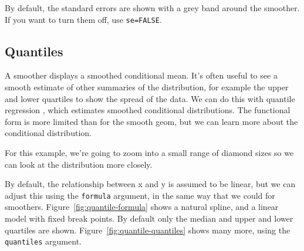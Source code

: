 By default, the standard errors are shown with a grey band around the smoother.  If you want to turn them off, use {\tt se=FALSE}.

\subsection{Quantiles}
\label{sub:quantile}

A smoother displays a smoothed conditional mean.  It's often useful to see a smooth estimate of other summaries of the distribution, for example the upper and lower quartiles to show the spread of the data.  We can do this with quantile regression \citep{koenker:2005}, which estimates smoothed conditional distributions.  The functional form is more limited than for the smooth geom, but we can learn more about the conditional distribution.

For this example, we're going to zoom into a small range of diamond sizes so we can look at the distribution more closely.

% 


By default, the relationship between x and y is assumed to be linear, but we can adjust this using the {\tt formula} argument, in the same way that we could for smoothers.  Figure~\ref{fig:quantile-formula} shows a natural spline, and a linear model with fixed break points.  By default only the median and upper and lower quartiles are shown.  Figure~\ref{fig:quantile-quantiles} shows many more, using the {\tt quantiles} argument.

% 


% 


